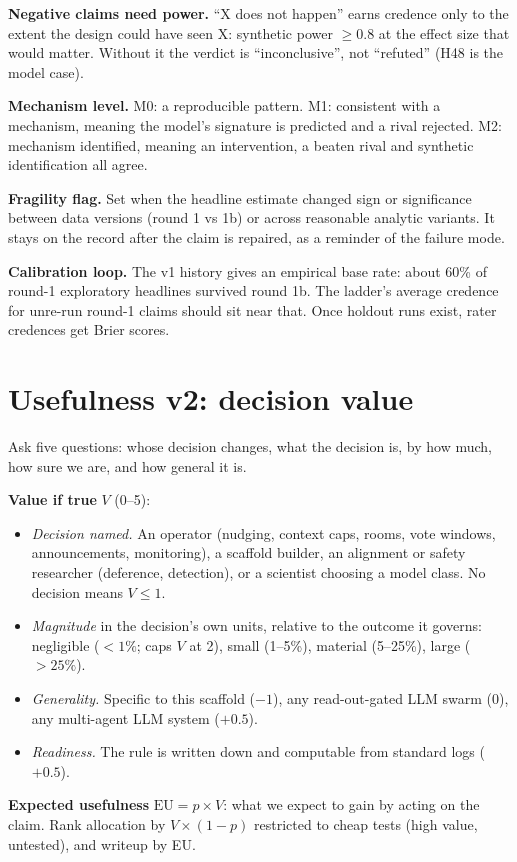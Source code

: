 \documentclass[aps,pre,reprint,10pt,nofootinbib]{revtex4-2}
\begin{document}
\textbf{Negative claims need power.} ``X does not happen'' earns credence only to the extent the design could have seen X: synthetic power $\geq 0.8$ at the effect size that would matter. Without it the verdict is ``inconclusive'', not ``refuted'' (H48 is the model case).

\textbf{Mechanism level.} M0: a reproducible pattern. M1: consistent with a mechanism, meaning the model's signature is predicted and a rival rejected. M2: mechanism identified, meaning an intervention, a beaten rival and synthetic identification all agree.

\textbf{Fragility flag.} Set when the headline estimate changed sign or significance between data versions (round 1 vs 1b) or across reasonable analytic variants. It stays on the record after the claim is repaired, as a reminder of the failure mode.

\textbf{Calibration loop.} The v1 history gives an empirical base rate: about 60\% of round-1 exploratory headlines survived round 1b. The ladder's average credence for unre-run round-1 claims should sit near that. Once holdout runs exist, rater credences get Brier scores.

\section{Usefulness v2: decision value}
Ask five questions: whose decision changes, what the decision is, by how much, how sure we are, and how general it is.

\textbf{Value if true} $V$ (0--5):
\begin{itemize}
\item \emph{Decision named.} An operator (nudging, context caps, rooms, vote windows, announcements, monitoring), a scaffold builder, an alignment or safety researcher (deference, detection), or a scientist choosing a model class. No decision means $V\leq1$.
\item \emph{Magnitude} in the decision's own units, relative to the outcome it governs: negligible ($<1\%$; caps $V$ at 2), small (1--5\%), material (5--25\%), large ($>25\%$).
\item \emph{Generality.} Specific to this scaffold ($-1$), any read-out-gated LLM swarm ($0$), any multi-agent LLM system ($+0.5$).
\item \emph{Readiness.} The rule is written down and computable from standard logs ($+0.5$).
\end{itemize}
\textbf{Expected usefulness} $\mathrm{EU}=p\times V$: what we expect to gain by acting on the claim. Rank allocation by $V\times(1-p)$ restricted to cheap tests (high value, untested), and writeup by EU.
\end{document}
